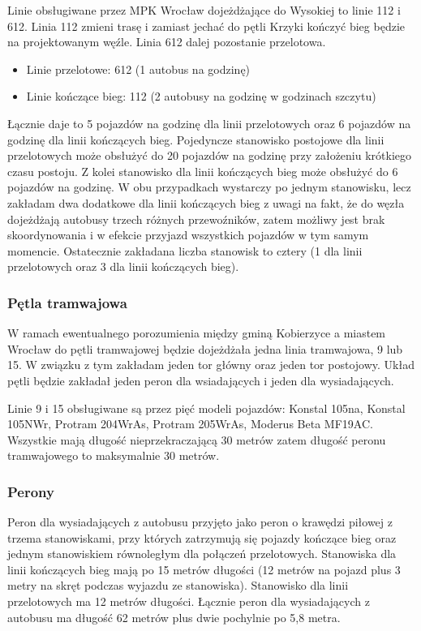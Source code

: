 \documentclass[twoside,12pt]{article}
\begin{document}
	Linie obsługiwane przez MPK Wrocław dojeżdżające do Wysokiej to linie 112 i 612. Linia 112 zmieni trasę i zamiast jechać do pętli Krzyki kończyć bieg będzie na projektowanym węźle. Linia 612 dalej pozostanie przelotowa.
	\begin{itemize}
	\item Linie przelotowe: 612 (1 autobus na godzinę)
	\item Linie kończące bieg: 112 (2 autobusy na godzinę w godzinach szczytu)
	\end{itemize}
	
	Łącznie daje to 5 pojazdów na godzinę dla linii przelotowych oraz 6 pojazdów na godzinę dla linii kończących bieg. Pojedyncze stanowisko postojowe dla linii przelotowych może obsłużyć do 20 pojazdów na godzinę przy założeniu krótkiego czasu postoju. Z kolei stanowisko dla linii kończących bieg może obsłużyć do 6 pojazdów na godzinę. W obu przypadkach wystarczy po jednym stanowisku, lecz zakładam dwa dodatkowe dla linii kończących bieg z uwagi na fakt, że do węzła dojeżdżają autobusy trzech różnych przewoźników, zatem możliwy jest brak skoordynowania i w efekcie przyjazd wszystkich pojazdów w tym samym momencie. Ostatecznie zakładana liczba stanowisk to cztery (1 dla linii przelotowych oraz 3 dla linii kończących bieg).
	
	\subsubsection{Pętla tramwajowa}
	
	W ramach ewentualnego porozumienia między gminą Kobierzyce a miastem Wrocław do pętli tramwajowej będzie dojeżdżała jedna linia tramwajowa, 9 lub 15. W związku z tym zakładam jeden tor główny oraz jeden tor postojowy. Układ pętli będzie zakładał jeden peron dla wsiadających i jeden dla wysiadających.
	
	Linie 9 i 15 obsługiwane są przez pięć modeli pojazdów: Konstal 105na, Konstal 105NWr, Protram 204WrAs, Protram 205WrAs, Moderus Beta MF19AC. Wszystkie mają długość nieprzekraczającą 30 metrów zatem długość peronu tramwajowego to maksymalnie 30 metrów.
	
	\subsubsection{Perony}
	
	Peron dla wysiadających z autobusu przyjęto jako peron o krawędzi piłowej z trzema stanowiskami, przy których zatrzymują się pojazdy kończące bieg oraz jednym stanowiskiem równoległym dla połączeń przelotowych. Stanowiska dla linii kończących bieg mają po 15 metrów długości (12 metrów na pojazd plus 3 metry na skręt podczas wyjazdu ze stanowiska). Stanowisko dla linii przelotowych ma 12 metrów długości. Łącznie peron dla wysiadających z autobusu ma długość 62 metrów plus dwie pochylnie po 5,8 metra. 
	
\end{document}
